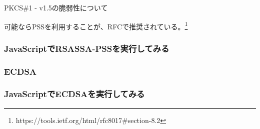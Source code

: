 \documentclass[12pt,dvipdfmx]{beamer}
\begin{document}
\begin{frame}
\alert{PKCS\#1 - v1.5の脆弱性について}


可能ならPSSを利用することが、RFCで推奨されている。\footnote[frame]{\scriptisize https://tools.ietf.org/html/rfc8017#section-8.2}
\end{frame}

\begin{frame}
\frametitle{JavaScriptでRSASSA-PSSを実行してみる}
\end{frame}

\begin{frame}
\frametitle{ECDSA}
\end{frame}

\begin{frame}
\frametitle{JavaScriptでECDSAを実行してみる}
\end{frame}
\end{document}
